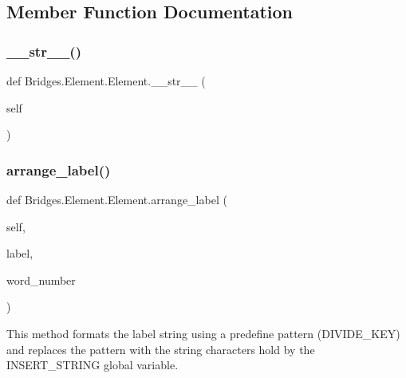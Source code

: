 \subsection{Member Function Documentation}
\mbox{\label{class_bridges_1_1_element_1_1_element_a674e4f757d4874b462ce1536328ddf38}} 
\subsubsection{\texorpdfstring{\+\_\+\+\_\+str\+\_\+\+\_\+()}{\_\_str\_\_()}}
{\footnotesize\ttfamily def Bridges.\+Element.\+Element.\+\_\+\+\_\+str\+\_\+\+\_\+ (\begin{DoxyParamCaption}\item[{}]{self }\end{DoxyParamCaption})}

\mbox{\label{class_bridges_1_1_element_1_1_element_a081734e11984d316f229254557a6795e}} 
\subsubsection{\texorpdfstring{arrange\+\_\+label()}{arrange\_label()}}
{\footnotesize\ttfamily def Bridges.\+Element.\+Element.\+arrange\+\_\+label (\begin{DoxyParamCaption}\item[{}]{self,  }\item[{}]{label,  }\item[{}]{word\+\_\+number }\end{DoxyParamCaption})}



This method formats the label string using a predefine pattern (D\+I\+V\+I\+D\+E\+\_\+\+K\+EY) and replaces the pattern with the string characters hold by the I\+N\+S\+E\+R\+T\+\_\+\+S\+T\+R\+I\+NG global variable. 


